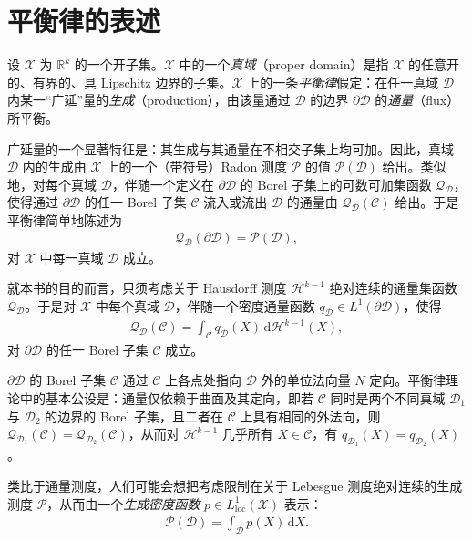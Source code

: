 \documentclass[../../main.tex]{subfiles}
\begin{document}
\section{平衡律的表述}\label{section:ch01-平衡律的表述}

设 $\mathscr{X}$ 为 $\mathbb{R}^{k}$ 的一个开子集。$\mathscr{X}$ 中的一个\emph{真域}（proper domain）是指 $\mathscr{X}$ 的任意开的、有界的、具 Lipschitz 边界的子集。$\mathscr{X}$ 上的一条\emph{平衡律}假定：在任一真域 $\mathscr{D}$ 内某一“广延”量的\emph{生成}（production），由该量通过 $\mathscr{D}$ 的边界 $\partial\mathscr{D}$ 的\emph{通量}（flux）所平衡。

广延量的一个显著特征是：其生成与其通量在不相交子集上均可加。因此，真域 $\mathscr{D}$ 内的生成由 $\mathscr{X}$ 上的一个（带符号）Radon 测度 $\mathscr{P}$ 的值 $\mathscr{P}(\mathscr{D})$ 给出。类似地，对每个真域 $\mathscr{D}$，伴随一个定义在 $\partial\mathscr{D}$ 的 Borel 子集上的可数可加集函数 $\mathscr{Q}_{\mathscr{D}}$，使得通过 $\partial\mathscr{D}$ 的任一 Borel 子集 $\mathscr{C}$ 流入或流出 $\mathscr{D}$ 的通量由 $\mathscr{Q}_{\mathscr{D}}(\mathscr{C})$ 给出。于是平衡律简单地陈述为
\begin{align}
\mathscr{Q}_{\mathscr{D}}(\partial\mathscr{D})=\mathscr{P}(\mathscr{D}),\label{align:ch01-balance-primitive}
\end{align}
对 $\mathscr{X}$ 中每一真域 $\mathscr{D}$ 成立。

就本书的目的而言，只须考虑关于 Hausdorff 测度 $\mathscr{H}^{k-1}$ 绝对连续的通量集函数 $\mathscr{Q}_{\mathscr{D}}$。于是对 $\mathscr{X}$ 中每个真域 $\mathscr{D}$，伴随一个密度通量函数 $q_{\mathscr{D}}\in L^{1}(\partial\mathscr{D})$，使得
\begin{align}
\mathscr{Q}_{\mathscr{D}}(\mathscr{C})=\int_{\mathscr{C}}q_{\mathscr{D}}(X)\,\mathrm{d}\mathscr{H}^{k-1}(X),\label{align:ch01-flux-density}
\end{align}
对 $\partial\mathscr{D}$ 的任一 Borel 子集 $\mathscr{C}$ 成立。

$\partial\mathscr{D}$ 的 Borel 子集 $\mathscr{C}$ 通过 $\mathscr{C}$ 上各点处指向 $\mathscr{D}$ 外的单位法向量 $N$ 定向。平衡律理论中的基本公设是：通量仅依赖于曲面及其定向，即若 $\mathscr{C}$ 同时是两个不同真域 $\mathscr{D}_{1}$ 与 $\mathscr{D}_{2}$ 的边界的 Borel 子集，且二者在 $\mathscr{C}$ 上具有相同的外法向，则 $\mathscr{Q}_{\mathscr{D}_{1}}(\mathscr{C})=\mathscr{Q}_{\mathscr{D}_{2}}(\mathscr{C})$，从而对 $\mathscr{H}^{k-1}$ 几乎所有 $X\in\mathscr{C}$，有 $q_{\mathscr{D}_{1}}(X)=q_{\mathscr{D}_{2}}(X)$。

类比于通量测度，人们可能会想把考虑限制在关于 Lebesgue 测度绝对连续的生成测度 $\mathscr{P}$，从而由一个\emph{生成密度函数} $p\in L^{1}_{\mathrm{loc}}(\mathscr{X})$ 表示：
\begin{align}
\mathscr{P}(\mathscr{D})=\int_{\mathscr{D}}p(X)\,\mathrm{d}X.\label{align:ch01-production-density}
\end{align}
\end{document}
